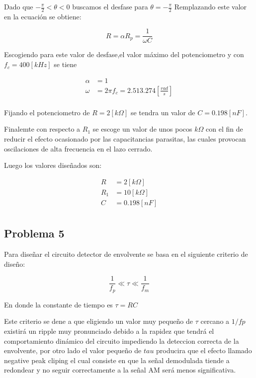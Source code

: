 \documentclass[letterpaper, titlepage]{article}
\begin{document}
		Dado que $- \frac{\pi}{2}< \theta < 0$ 	buscamos el desfase para $\theta =- \frac{\pi}{2}$ Remplazando este valor en la ecuación se obtiene:

		\begin{equation}
			R = \alpha R_{p} = \frac{1}{\omega C}
		\end{equation}

		Escogiendo para este valor de desfase,el valor máximo del potenciometro y con $f_{c}= 400[kHz]$ se tiene

		\begin{align*}
			\alpha & = 1 \\
			\omega & = 2 \pi f_{c} = 2.513.274 [\frac{rad}{s}] \\
		\end{align*}

		Fijando el potenciometro de $ R=2[k \Omega ] $ se tendra un valor de $ C = 0.198[nF] $.

		Finalemte con respecto a $ R_{1} $ se escoge un valor de unos pocos $ k \Omega $ con el fin de reducir el efecto ocasionado por las capacitancias parasitas, las cuales provocan oscilaciones de alta frecuencia en el lazo cerrado. 

		Luego los valores diseñados son:

		\begin{align*}
			R & = 2[k \Omega] \\
			R_{1} & = 10[k \Omega] \\
			C & = 0.198[nF] \\
		\end{align*}

		\newpage

	\subsection{Problema 5}

		Para diseñar el circuito detector de envolvente se basa en el siguiente criterio de diseño:

		\begin{equation}
			\frac{1}{f_{p}} \ll \tau \ll \frac{1}{f_{m}}
		\end{equation}

		En donde la constante de tiempo es $\tau = RC$

		Este criterio se dene a que eligiendo un valor muy pequeño de $\tau$ cercano a $1/fp$ existirá un ripple muy pronunciado debido a la rapidez que tendrá el comportamiento dinámico del circuito impediendo la deteccion correcta de la envolvente, por otro lado el valor pequeño de $tau$ producira que el efecto llamado negative peak cliping el cual consiste en que la señal demodulada tiende a redondear y no seguir correctamente a la señal AM será menos significativa.
\end{document}
